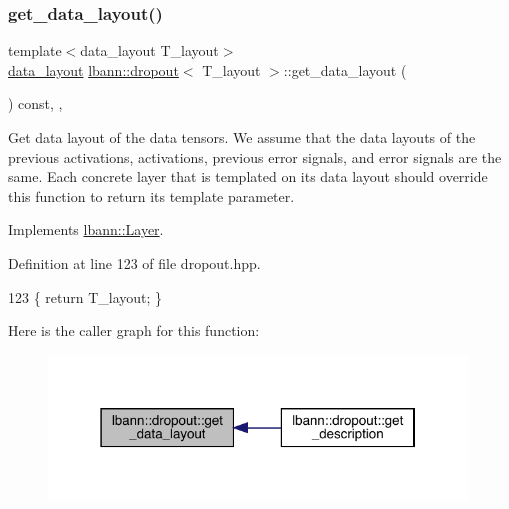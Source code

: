 \subsubsection{\texorpdfstring{get\+\_\+data\+\_\+layout()}{get\_data\_layout()}}
{\footnotesize\ttfamily template$<$data\+\_\+layout T\+\_\+layout$>$ \\
\hyperlink{base_8hpp_a786677cbfb3f5677b4d84f3056eb08db}{data\+\_\+layout} \hyperlink{classlbann_1_1dropout}{lbann\+::dropout}$<$ T\+\_\+layout $>$\+::get\+\_\+data\+\_\+layout (\begin{DoxyParamCaption}{ }\end{DoxyParamCaption}) const\hspace{0.3cm}{\ttfamily [inline]}, {\ttfamily [override]}, {\ttfamily [virtual]}}

Get data layout of the data tensors. We assume that the data layouts of the previous activations, activations, previous error signals, and error signals are the same. Each concrete layer that is templated on its data layout should override this function to return its template parameter. 

Implements \hyperlink{classlbann_1_1Layer_a5dfb66e81fc085997402a5e2241316bd}{lbann\+::\+Layer}.



Definition at line 123 of file dropout.\+hpp.


\begin{DoxyCode}
123 \{ \textcolor{keywordflow}{return} T\_layout; \}
\end{DoxyCode}
Here is the caller graph for this function\+:\nopagebreak
\begin{figure}[H]
\begin{center}
\leavevmode
\includegraphics[width=315pt]{classlbann_1_1dropout_aefeb16614f9bf4b9e643e1d5b48ec62d_icgraph}
\end{center}
\end{figure}
\mbox{\label{classlbann_1_1dropout_a7b53ee7d758337fe40788a567b5d092c}} 
